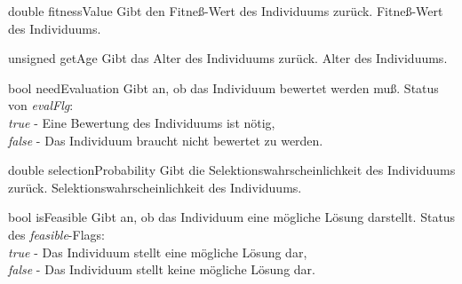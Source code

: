 \documentclass{report}
\begin{document}
\vspace{4ex}

\setConstInstance
\printEmptyMethodReturn
{double}
{fitnessValue}
{Gibt den Fitne{\ss}-Wert des Individuums zur\"uck.}
{Fitne{\ss}-Wert des Individuums.}

\vspace{4ex}

\setConstInstance
\printEmptyMethodReturn
{unsigned}
{getAge}
{Gibt das Alter des Individuums zur\"uck.}
{Alter des Individuums.}

\newpage

\setConstInstance
\printEmptyMethodReturn
{bool}
{needEvaluation}
{Gibt an, ob das Individuum bewertet werden mu{\ss}.}
{Status von {\em evalFlg}:\\
 {\em true} - Eine Bewertung des Individuums ist n\"otig,\\
 {\em false} - Das Individuum braucht nicht bewertet zu werden.}

\vspace{4ex}

\setConstInstance
\printEmptyMethodReturn
{double}
{selectionProbability}
{Gibt die Selektionswahrscheinlichkeit des Individuums zur\"uck.}
{Selektionswahrscheinlichkeit des Individuums.}

\vspace{4ex}

\setConstInstance
\printEmptyMethodReturn
{bool}
{isFeasible}
{Gibt an, ob das Individuum eine m\"ogliche L\"osung darstellt.}
{Status des {\em feasible}-Flags:\\
 {\em true} - Das Individuum stellt eine m\"ogliche L\"osung dar,\\
 {\em false} - Das Individuum stellt keine m\"ogliche L\"osung dar.}
\end{document}
